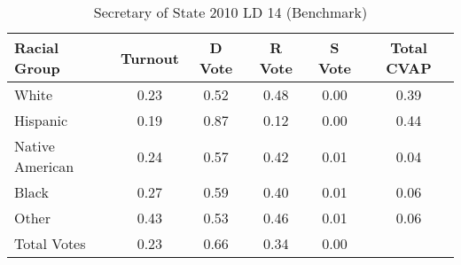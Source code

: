 \begin{table}[htb]
\begin{center}
\caption{Secretary of State 2010 LD 14 (Benchmark)}
\label{sos10_cvap_ld_14_benchmark}
\begin{tabular}{lccccc}
  \hline
Racial Group & Turnout & D Vote & R Vote & S Vote & Total CVAP \\ 
  \hline
White & 0.23 & 0.52 & 0.48 & 0.00 & 0.39 \\ 
  Hispanic & 0.19 & 0.87 & 0.12 & 0.00 & 0.44 \\ 
  Native American & 0.24 & 0.57 & 0.42 & 0.01 & 0.04 \\ 
  Black & 0.27 & 0.59 & 0.40 & 0.01 & 0.06 \\ 
  Other & 0.43 & 0.53 & 0.46 & 0.01 & 0.06 \\ 
  Total Votes & 0.23 & 0.66 & 0.34 & 0.00 &  \\ 
   \hline
\end{tabular}
\end{center}
\end{table}
